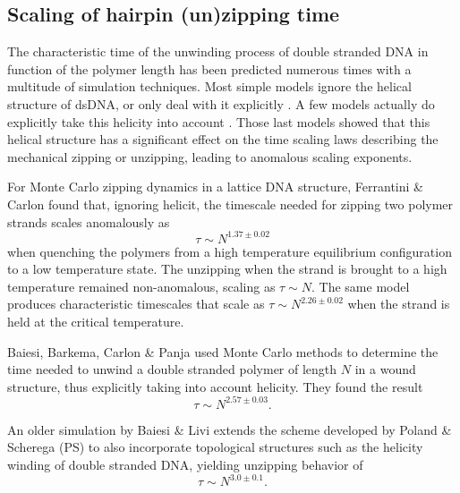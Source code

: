 \subsection{Scaling of hairpin (un)zipping time}

The characteristic time of the unwinding process of double stranded DNA in function of the polymer length has been predicted numerous times with a multitude of simulation techniques. Most simple models ignore the helical structure of dsDNA, or only deal with it explicitly \cite{carlon2011anomalous, walter2011fractional}. A few models actually do explicitly take this helicity into account \cite{baiesi2009multiple, carlon2010unwinding}. Those last models showed that this helical structure has a significant effect on the time scaling laws describing the mechanical zipping or unzipping, leading to anomalous scaling exponents\cite{carlon2010unwinding}.


For Monte Carlo zipping dynamics in a lattice DNA structure, Ferrantini \& Carlon \cite{carlon2011anomalous} found that, ignoring helicit, the timescale needed for zipping two polymer strands scales anomalously as
\begin{equation}
\tau \sim N^{1.37\pm0.02}
\end{equation}
when quenching the polymers from a high temperature equilibrium configuration to a low temperature state. The unzipping when the strand is brought to a high temperature remained non-anomalous, scaling as $\tau \sim N$. The same model produces characteristic timescales that scale as $\tau \sim N^{2.26 \pm 0.02}$ when the strand is held at the critical temperature.

Baiesi, Barkema, Carlon \& Panja \cite{carlon2010unwinding} used Monte Carlo methods to determine the time needed to unwind a double stranded polymer of length $N$ in a wound structure, thus explicitly taking into account helicity. They found the result
\begin{equation}
\tau \sim N^{2.57\pm 0.03}.
\end{equation}

An older simulation by Baiesi \& Livi \cite{baiesi2009multiple} extends the scheme developed by Poland \& Scherega (PS) \cite{poland1966phase} to also incorporate topological structures such as the helicity winding of double stranded DNA, yielding unzipping behavior of
\begin{equation}
\tau \sim N^{3.0\pm 0.1}.
\end{equation}




